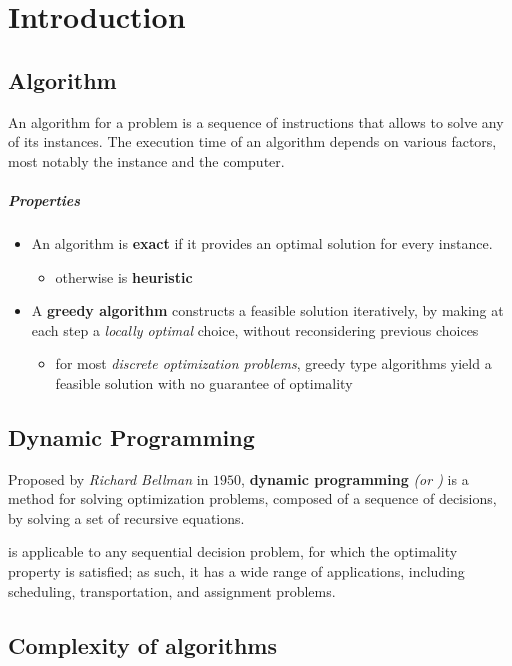 \documentclass[english]{article}
\begin{document}
\makecover

\section{Introduction}

\subsection{Algorithm}

An algorithm for a problem is a sequence of instructions that allows to solve any of its instances.
The execution time of an algorithm depends on various factors, most notably the instance and the computer.

\subparagraph*{Properties}

\begin{itemize}
  \item An algorithm is \textbf{exact} if it provides an optimal solution for every instance.
        \begin{itemize}
          \item otherwise is \textbf{heuristic}
        \end{itemize}
  \item A \textbf{greedy algorithm} constructs a feasible solution iteratively, by making at each step a \textit{locally optimal} choice, without reconsidering previous choices
        \begin{itemize}
          \item for most \textit{discrete optimization problems}, greedy type algorithms yield a feasible solution with no guarantee of optimality
        \end{itemize}
\end{itemize}

\subsection{Dynamic Programming}

Proposed by \textit{Richard Bellman} in \(1950\), \textbf{dynamic programming} \textit{(or \DP)} is a method for solving optimization problems, composed of a sequence of decisions, by solving a set of recursive equations.

\DP is applicable to any sequential decision problem, for which the optimality property is satisfied;
as such, it has a wide range of applications, including scheduling, transportation, and assignment problems.

\subsection{Complexity of algorithms}
\end{document}
